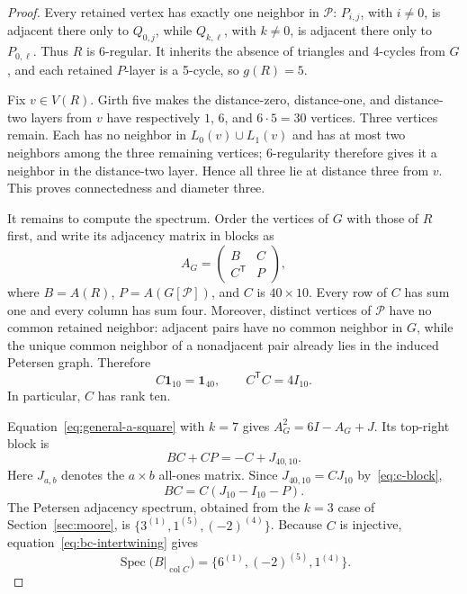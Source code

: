 \documentclass[a4paper,11pt,reqno]{amsart}
\theoremstyle{plain}
\theoremstyle{definition}
\theoremstyle{remark}
\newcommand{\Spec}{\operatorname{Spec}}
\begin{document}
\begin{proof}
Every retained vertex has exactly one neighbor in \(\mathcal P\):
\(P_{i,j}\), with \(i\ne0\), is adjacent there only to \(Q_{0,j}\), while
\(Q_{k,\ell}\), with \(k\ne0\), is adjacent there only to \(P_{0,\ell}\).
Thus \(R\) is 6-regular.  It inherits the absence of triangles and 4-cycles
from \(G\), and each retained \(P\)-layer is a 5-cycle, so \(g(R)=5\).

Fix \(v\in V(R)\).  Girth five makes the distance-zero, distance-one, and
distance-two layers from \(v\) have respectively \(1\), \(6\), and
\(6\cdot5=30\) vertices.  Three vertices remain.  Each has no neighbor in
\(L_0(v)\cup L_1(v)\) and has at most two neighbors among the three remaining
vertices; 6-regularity therefore gives it a neighbor in the distance-two
layer.  Hence all three lie at distance three from \(v\).  This proves
connectedness and diameter three.

It remains to compute the spectrum.  Order the vertices of \(G\) with those
of \(R\) first, and write its adjacency matrix in blocks as
\[
 A_G=\begin{pmatrix}B&C\\ C^{\mathsf T}&P\end{pmatrix},
\]
where \(B=A(R)\), \(P=A(G[\mathcal P])\), and \(C\) is \(40\times10\).
Every row of \(C\) has sum one and every column has sum four.  Moreover,
distinct vertices of \(\mathcal P\) have no common retained neighbor: adjacent
pairs have no common neighbor in \(G\), while the unique common neighbor of a
nonadjacent pair already lies in the induced Petersen graph.  Therefore
\begin{equation}\label{eq:c-block}
 C\mathbf1_{10}=\mathbf1_{40},\qquad C^{\mathsf T}C=4I_{10}.
\end{equation}
In particular, \(C\) has rank ten.

Equation~\eqref{eq:general-a-square} with \(k=7\) gives
\(A_G^2=6I-A_G+J\).  Its top-right block is
\[
 BC+CP=-C+J_{40,10}.
\]
Here \(J_{a,b}\) denotes the \(a\times b\) all-ones matrix.  Since
\(J_{40,10}=CJ_{10}\) by~\eqref{eq:c-block},
\begin{equation}\label{eq:bc-intertwining}
 BC=C(J_{10}-I_{10}-P).
\end{equation}
The Petersen adjacency spectrum, obtained from the \(k=3\) case of
Section~\ref{sec:moore}, is
\(\{3^{(1)},1^{(5)},(-2)^{(4)}\}\).  Because \(C\) is injective,
equation~\eqref{eq:bc-intertwining} gives
\[
 \Spec\bigl(B|_{\operatorname{col}C}\bigr)
 =\{6^{(1)},(-2)^{(5)},1^{(4)}\}.
\]


\end{proof}
\end{document}
